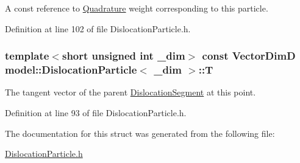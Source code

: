 A const reference to \hyperlink{structmodel_1_1_quadrature}{Quadrature} weight corresponding to this particle. 



Definition at line 102 of file Dislocation\+Particle.\+h.

\hypertarget{structmodel_1_1_dislocation_particle_a2e4c468c20b98459256a746dca56701d}{}
\subsubsection[{T}]{\setlength{\rightskip}{0pt plus 5cm}template$<$short unsigned int \+\_\+dim$>$ const {\bf Vector\+Dim\+D} {\bf model\+::\+Dislocation\+Particle}$<$ \+\_\+dim $>$\+::T}\label{structmodel_1_1_dislocation_particle_a2e4c468c20b98459256a746dca56701d}


The tangent vector of the parent \hyperlink{classmodel_1_1_dislocation_segment}{Dislocation\+Segment} at this point. 



Definition at line 93 of file Dislocation\+Particle.\+h.



The documentation for this struct was generated from the following file\+:\begin{DoxyCompactItemize}
\item 
\hyperlink{_dislocation_particle_8h}{Dislocation\+Particle.\+h}\end{DoxyCompactItemize}
